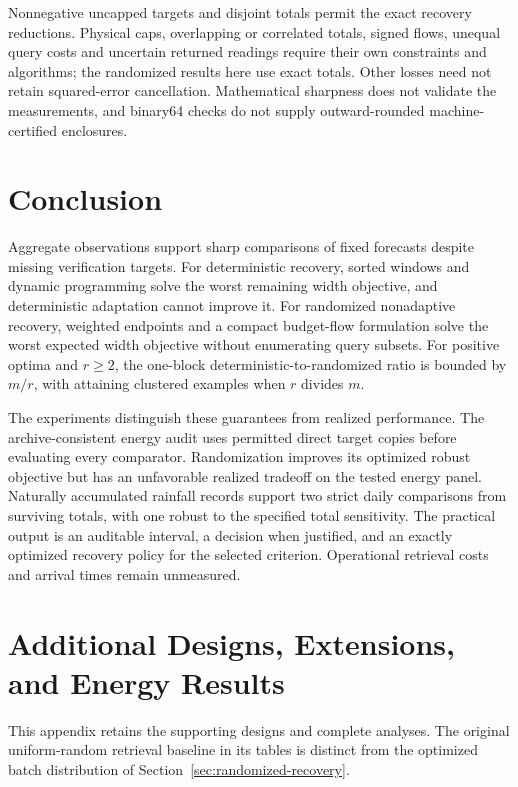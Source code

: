 \documentclass[12pt]{article}
\begin{document}
Nonnegative uncapped targets and disjoint totals permit the exact recovery
reductions. Physical caps, overlapping or correlated totals, signed flows,
unequal query costs and uncertain returned readings require their own
constraints and algorithms; the randomized results here use exact totals.
Other losses need not retain squared-error cancellation. Mathematical
sharpness does not validate the measurements, and binary64 checks do not
supply outward-rounded machine-certified enclosures.

\FloatBarrier
\section{Conclusion}
Aggregate observations support sharp comparisons of fixed forecasts despite
missing verification targets. For deterministic recovery, sorted windows
and dynamic programming solve the worst remaining width objective, and
deterministic adaptation cannot improve it. For randomized nonadaptive
recovery, weighted endpoints and a compact budget-flow formulation solve
the worst expected width objective without enumerating query subsets.
For positive optima and $r\geq2$, the one-block deterministic-to-randomized ratio is bounded by $m/r$, with
attaining clustered examples when $r$ divides $m$.

The experiments distinguish these guarantees from realized performance.
The archive-consistent energy audit uses permitted direct target copies
before evaluating every comparator. Randomization improves its optimized
robust objective but has an unfavorable realized tradeoff on the tested
energy panel. Naturally accumulated rainfall records support two strict
daily comparisons from surviving totals, with one robust to the specified
total sensitivity. The practical output is an auditable interval, a decision
when justified, and an exactly optimized recovery policy for the selected
criterion. Operational retrieval costs and arrival times remain unmeasured.

\FloatBarrier
\appendix
\section{Additional Designs, Extensions, and Energy Results}\label{app:additional}
This appendix retains the supporting designs and complete analyses. The
original uniform-random retrieval baseline in its tables is distinct from
the optimized batch distribution of Section~\ref{sec:randomized-recovery}.
\end{document}
